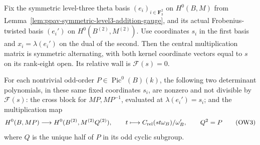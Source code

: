 \begin{lemma}
\label{lem:odd-cover-common-Fermat-coordinates}
Fix the symmetric level-three theta basis \((e_i)_{i\in\mathbf F_3^2}\)
on \(H^0(B,M)\) from
Lemma~\ref{lem:ppav-symmetric-level3-addition-gauge}, and its actual
Frobenius-twisted basis \((e_i')\) on \(H^0(B^{(2)},M^{(2)})\).
Use coordinates \(s_i\) in the first basis and \(x_i=\lambda(e_i')\)
on the dual of the second.  Then the central multiplication matrix
is symmetric alternating, with both kernel coordinate vectors equal
to \(s\) on its rank-eight open.  Its relative wall is
\(\mathcal F(s)=0\).

For each nontrivial odd-order \(P\in\operatorname{Pic}^0(B)(k)\),
the following two determinant polynomials, in these same fixed
coordinates \(s_i\), are nonzero and not divisible by \(\mathcal F(s)\):
the cross block for \(MP,MP^{-1}\), evaluated at
\(\lambda(e_i')=s_i\); and the multiplication map
\[
 H^0(B,MP)\longrightarrow H^0(B^{(2)},M^{(2)}Q^{(2)}),
 \qquad t\longmapsto C_{\rm rel}(st\omega_B)/\omega_B',
 \qquad Q^2=P
 \tag{OW3}
\]
where \(Q\) is the unique half of \(P\) in its odd cyclic subgroup.
\end{lemma}
